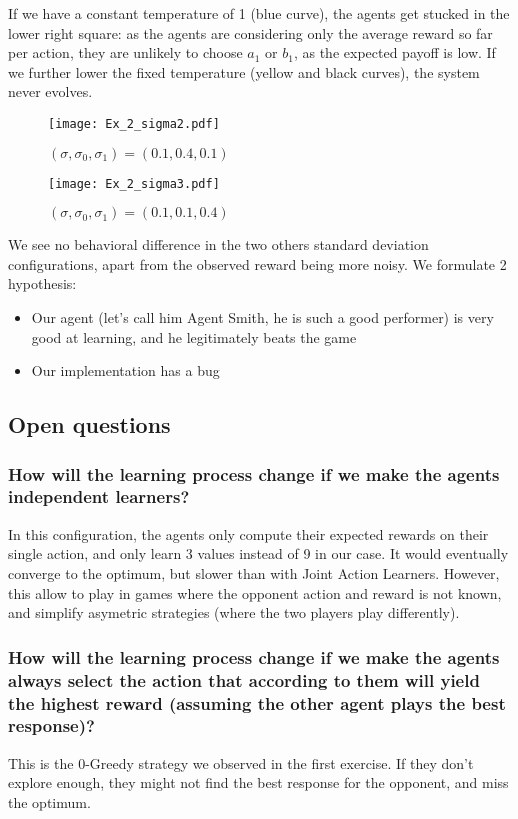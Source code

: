 \documentclass[a4paper,11pt]{article}
\begin{document}
If we have a constant temperature of 1 (blue curve), the agents get stucked in the lower right square: as the agents are considering only the average reward so far per action, they are unlikely to choose $a_1$ or $b_1$, as the expected payoff is low. If we further lower the fixed temperature (yellow and black curves), the system never evolves.

\begin{figure}[H]
  \center
  \texttt{[image: Ex\_2\_sigma2.pdf]}
  \caption{\label{fig:2.2} $(\sigma, \sigma_{0}, \sigma_{1}) = (0.1, 0.4, 0.1)$}
\end{figure}

\begin{figure}[H]
  \center
  \texttt{[image: Ex\_2\_sigma3.pdf]}
  \caption{\label{fig:2.3} $(\sigma, \sigma_{0}, \sigma_{1}) = (0.1, 0.1, 0.4)$}
\end{figure}

We see no behavioral difference in the two others standard deviation configurations, apart from the observed reward being more noisy. We formulate 2 hypothesis:

\begin{itemize}
  \item Our agent (let's call him Agent Smith, he is such a good performer) is very good at learning, and he legitimately beats the game
  \item Our implementation has a bug
\end{itemize}

\subsection{Open questions}
\subsubsection{How will the learning process change if we make the agents independent learners?}
In this configuration, the agents only compute their expected rewards on their single action, and only learn 3 values instead of 9 in our case. It would eventually converge to the optimum, but slower than with Joint Action Learners. However, this allow to play in games where the opponent action and reward is not known, and simplify asymetric strategies (where the two players play differently).

\subsubsection{How will the learning process change if we make the agents always select the action that according to them will yield the highest reward (assuming the other agent plays the best response)?}
This is the 0-Greedy strategy we observed in the first exercise. If they don't explore enough, they might not find the best response for the opponent, and miss the optimum.
\end{document}
